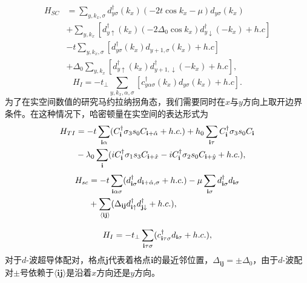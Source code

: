 \begin{equation}
	\begin{aligned}
		H_{SC} &= \sum_{y,k_x,\sigma}d^\dagger_{y\sigma}(k_x)(-2t\cos k_x -\mu)d_{y\sigma}(k_x)\\
		&+\sum_{y,k_x}[d^\dagger_{y\uparrow}(k_x)(-2\Delta_0\cos k_x)d^\dagger_{y\downarrow}(-k_x)+h.c]
		\\&-t\sum_{y,k_x,\sigma}[d^\dagger_{y\sigma}(k_x)d_{y+1,\sigma}(k_x)+h.c]\\
		&+\Delta_0\sum_{y,k_x}[d^\dagger_{y\uparrow}(k_x)d^\dagger_{y+1,\downarrow}(-k_x)+h.c],
	\end{aligned}
\end{equation}
\begin{equation}
	H_I=-t_\perp\sum_{y,k_x,\alpha,\sigma}[c^\dagger_{y\alpha\sigma}(k_x)d_{y\sigma}(k_x)+h.c].
\end{equation}
\qquad 为了在实空间数值的研究马约拉纳拐角态，我们需要同时在$x$与$y$方向上取开边界条件。在这种情况下，哈密顿量在实空间的表达形式为
\begin{equation}
	\begin{aligned}
		H_{TI} &=-t\sum_{{\bf i}\alpha}(C_{{\bf i}}^\dagger \sigma_3s_0   C_{{\bf i}+\hat{\alpha}}+h.c.)+h_0\sum_{{\bf i}\tau}C_{{\bf i}}^\dagger \sigma_3s_0   C_{{\bf i}}
		\\&-\lambda_0\sum_{{\bf i}}(iC_{{\bf i}}^\dagger\sigma_1s_3C_{{\bf i}+\hat{x}}-iC_{{\bf i}}^\dagger\sigma_2s_0C_{{\bf i}+\hat{y}}+h.c.),
	\end{aligned}
\end{equation}
\begin{equation}
	\begin{aligned}
		H_{sc} &=-t\sum_{{\bf i}\alpha\sigma}(d_{{\bf i}\sigma}^\dagger d_{{\bf i}+\hat{\alpha},\sigma}+h.c.)-\mu\sum_{{\bf i}\sigma}d_{{\bf i}\sigma}^\dagger d_{{\bf i}\sigma}
		\\&+\sum_{\langle{\bf ij}\rangle}(\Delta_{\bf ij}d_{{\bf i}\uparrow}^\dagger d_{{\bf j}\downarrow}^\dagger+h.c.),
	\end{aligned}
\end{equation}

\begin{equation}
	H_{I}=-t_\perp \sum_{{\bf i}\tau\sigma}(c_{{\bf i}\tau\sigma}^\dagger d_{{\bf i}\sigma}+h.c.),
\end{equation}
对于$d$-波超导体配对，格点$\mathbf{j}$代表着格点$\mathbf{i}$的最近邻位置，$\Delta_\mathbf{ij}=\pm\Delta_0$，由于$d$-波配对$\pm$号依赖于$\langle\mathbf{ij}\rangle$是沿着$x$方向还是$y$方向。

